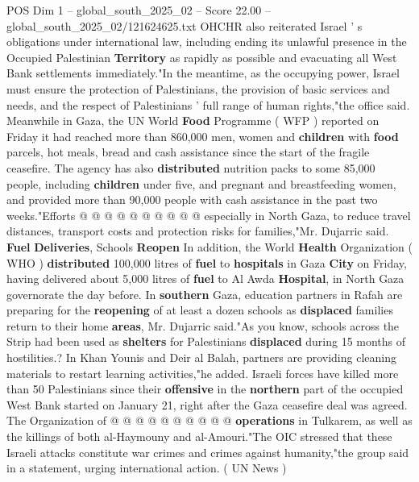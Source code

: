 \begin{textsample}{POS Dim 1 – global\_south\_2025\_02 – Score 22.00 – global\_south\_2025\_02/121624625.txt}
OHCHR also reiterated Israel ' s obligations under international law, including ending its unlawful presence in the Occupied Palestinian \textbf{Territory} as rapidly as possible and evacuating all West Bank settlements immediately."In the meantime, as the occupying power, Israel must ensure the protection of Palestinians, the provision of basic services and needs, and the respect of Palestinians ' full range of human rights,"the office said.
Meanwhile in Gaza, the UN World \textbf{Food} Programme ( WFP ) reported on Friday it had reached more than 860,000 men, women and \textbf{children} with \textbf{food} parcels, hot meals, bread and cash assistance since the start of the fragile ceasefire.
The agency has also \textbf{distributed} nutrition packs to some 85,000 people, including \textbf{children} under five, and pregnant and breastfeeding women, and provided more than 90,000 people with cash assistance in the past two weeks."Efforts @ @ @ @ @ @ @ @ @ @ especially in North Gaza, to reduce travel distances, transport costs and protection risks for families,"Mr.
Dujarric said. \textbf{Fuel} \textbf{Deliveries}, Schools \textbf{Reopen} In addition, the World \textbf{Health} Organization ( WHO ) \textbf{distributed} 100,000 litres of \textbf{fuel} to \textbf{hospitals} in Gaza \textbf{City} on Friday, having delivered about 5,000 litres of \textbf{fuel} to Al Awda \textbf{Hospital}, in North Gaza governorate the day before.
In \textbf{southern} Gaza, education partners in Rafah are preparing for the \textbf{reopening} of at least a dozen schools as \textbf{displaced} families return to their home \textbf{areas}, Mr.
Dujarric said."As you know, schools across the Strip had been used as \textbf{shelters} for Palestinians \textbf{displaced} during 15 months of hostilities.?
In Khan Younis and Deir al Balah, partners are providing cleaning materials to restart learning activities,"he added.
Israeli forces have killed more than 50 Palestinians since their \textbf{offensive} in the \textbf{northern} part of the occupied West Bank started on January 21, right after the Gaza ceasefire deal was agreed.
The Organization of @ @ @ @ @ @ @ @ @ @ \textbf{operations} in Tulkarem, as well as the killings of both al-Haymouny and al-Amouri."The OIC stressed that these Israeli attacks constitute war crimes and crimes against humanity,"the group said in a statement, urging international action. ( UN News )

\end{textsample}
